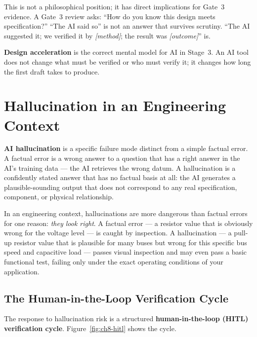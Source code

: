 This is not a philosophical position; it has direct implications for Gate~3 evidence.
A Gate~3 review asks: ``How do you know this design meets specification?''
``The AI said so'' is not an answer that survives scrutiny.
``The AI suggested it; we verified it by \emph{[method]}; the result was
\emph{[outcome]}'' is.

\textbf{Design acceleration} is the correct mental
model for AI in Stage~3.
An AI tool does not change what must be verified or who must verify it; it
changes how long the first draft takes to produce.

\section{Hallucination in an Engineering Context}
\label{sec:ch8-hallucination}

\textbf{AI hallucination} is a specific failure mode
distinct from a simple factual error.
A factual error is a wrong answer to a question that has a right answer in the
AI's training data --- the AI retrieves the wrong datum.
A hallucination is a confidently stated answer that has no factual basis at
all: the AI generates a plausible-sounding output that does not correspond to
any real specification, component, or physical relationship.

In an engineering context, hallucinations are more dangerous than factual
errors for one reason: \emph{they look right}.
A factual error --- a resistor value that is obviously wrong for the voltage
level --- is caught by inspection.
A hallucination --- a pull-up resistor value that is plausible for many buses
but wrong for this specific bus speed and capacitive load --- passes visual
inspection and may even pass a basic functional test, failing only under the
exact operating conditions of your application.

\subsection{The Human-in-the-Loop Verification Cycle}
\label{sec:ch8-hitl}

The response to hallucination risk is a structured
\textbf{human-in-the-loop (HITL) verification cycle}.
Figure~\ref{fig:ch8-hitl} shows the cycle.

